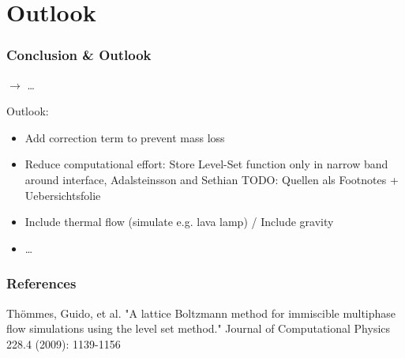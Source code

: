\documentclass[ucs]{beamer}
\begin{document}
\section{Outlook}
\begin{frame}
\frametitle{Conclusion \& Outlook}
$\rightarrow$ \dots

\vspace{.8cm}
Outlook:
\begin{itemize}
\item<1-> Add correction term to prevent mass loss
\item<1-> Reduce computational effort: Store Level-Set function only in narrow band around interface, Adalsteinsson and Sethian
TODO: Quellen als Footnotes + Uebersichtsfolie
\item<2-> Include thermal flow (simulate e.g. lava lamp) / Include gravity
\item<3-> \dots
\end{itemize}

\end{frame}

\begin{frame}
\frametitle{References}
\begin{thebibliography}{etw}
     Thömmes, Guido, et al. "A lattice Boltzmann method for immiscible multiphase flow simulations using the level set method." Journal of Computational Physics 228.4 (2009): 1139-1156
\end{thebibliography}
\end{frame}
\end{document}
